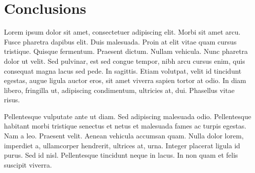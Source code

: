 \newpage
\chapter{Conclusions}

Lorem ipsum dolor sit amet, consectetuer adipiscing elit. Morbi sit amet arcu. Fusce pharetra dapibus elit. Duis malesuada. Proin at elit vitae quam cursus tristique. Quisque fermentum. Praesent dictum. Nullam vehicula. Nunc pharetra dolor ut velit. Sed pulvinar, est sed congue tempor, nibh arcu cursus enim, quis consequat magna lacus sed pede. In sagittis. Etiam volutpat, velit id tincidunt egestas, augue ligula auctor eros, sit amet viverra sapien tortor at odio. In diam libero, fringilla ut, adipiscing condimentum, ultricies at, dui. Phasellus vitae risus.

Pellentesque vulputate ante ut diam. Sed adipiscing malesuada odio. Pellentesque habitant morbi tristique senectus et netus et malesuada fames ac turpis egestas. Nam a leo. Praesent velit. Aenean vehicula accumsan quam. Nulla dolor lorem, imperdiet a, ullamcorper hendrerit, ultrices at, urna. Integer placerat ligula id purus. Sed id nisl. Pellentesque tincidunt neque in lacus. In non quam et felis suscipit viverra.